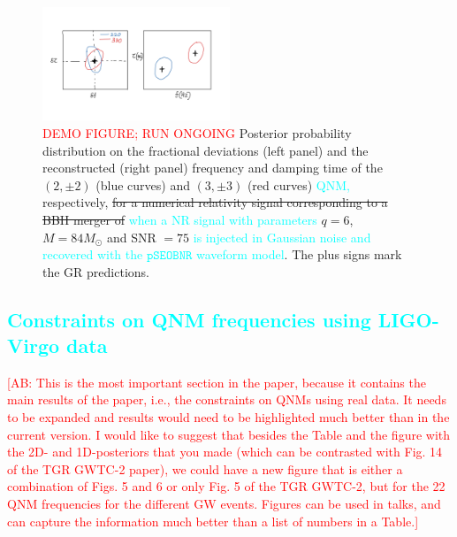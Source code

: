\documentclass[twocolumn,prd,aps,superscriptaddress,preprintnumbers,tightenlines,showpacs,nofootinbib,eqsecnum,amsfonts,amsmath]{revtex4-1}
\newcommand{\ab}[1]{\textcolor{cyan}{#1}}
\newcommand{\comment}[1]{\textcolor{red}{[#1]}}
\newcommand{\Mo}{M_{\odot}}
\newcommand{\pSEOB}{\texttt{pSEOBNR}}
\begin{document}

\begin{figure}
	\includegraphics[width=0.5\textwidth]{figures/nohair_sxs_0166_placeholder.png}	
	\caption{\textcolor{red}{DEMO FIGURE; RUN ONGOING} Posterior probability distribution on the fractional deviations (left panel) and the reconstructed (right panel) frequency and damping time of the $(2,\pm 2)$ (blue curves) and $(3,\pm 3)$ (red curves) \ab{QNM,} respectively, \sout{for a numerical relativity signal corresponding to a BBH merger of} \ab{when a NR signal with parameters} $q=6$,  $M=84 \Mo$ and SNR $=75$ \ab{is injected in Gaussian noise and recovered with the $\pSEOB$ waveform model}. The plus signs mark the GR predictions.}
	\label{fig:nohair_sxs}
\end{figure}

\ab{\section{Constraints on QNM frequencies using LIGO-Virgo data}}

\comment{AB: This is the most important section in the paper, because it contains the 
main results of the paper, i.e., the constraints on QNMs using real data. It needs to 
be expanded and results would need to be highlighted much better than in the current version. 
I would like to suggest that besides the Table and the figure with the 2D- and 1D-posteriors 
that you made (which can be contrasted with Fig. 14 of the TGR GWTC-2 paper), we could have 
a new figure that is either a combination of Figs. 5 and 6 or only Fig. 5 of the 
TGR GWTC-2, but for the 22 QNM frequencies for the different GW events. 
Figures can be used in talks, and can capture the information much better 
than a list of numbers in a Table.}
\end{document}
